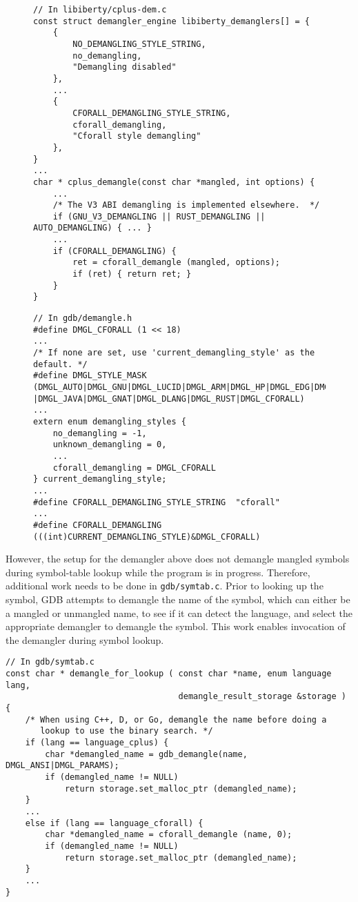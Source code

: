 \begin{figure}
\begin{lstlisting}[style=C++, caption={libiberty setup for the \CFAS demangler},
label={cfa-demangler}, basicstyle=\small]
// In libiberty/cplus-dem.c
const struct demangler_engine libiberty_demanglers[] = {
    {
        NO_DEMANGLING_STYLE_STRING,
        no_demangling,
        "Demangling disabled"
    },
    ...
    {
        CFORALL_DEMANGLING_STYLE_STRING,
        cforall_demangling,
        "Cforall style demangling"
    },
}
...
char * cplus_demangle(const char *mangled, int options) {
    ...
    /* The V3 ABI demangling is implemented elsewhere.  */
    if (GNU_V3_DEMANGLING || RUST_DEMANGLING || AUTO_DEMANGLING) { ... }
    ...
    if (CFORALL_DEMANGLING) {
        ret = cforall_demangle (mangled, options);
        if (ret) { return ret; }
    }
}
\end{lstlisting}

\begin{lstlisting}[style=C++, caption={Setup \CFAS demangler style},
label={cfa-demangler-style}, basicstyle=\small]
// In gdb/demangle.h
#define DMGL_CFORALL (1 << 18)
...
/* If none are set, use 'current_demangling_style' as the default. */
#define DMGL_STYLE_MASK
(DMGL_AUTO|DMGL_GNU|DMGL_LUCID|DMGL_ARM|DMGL_HP|DMGL_EDG|DMGL_GNU_V3
|DMGL_JAVA|DMGL_GNAT|DMGL_DLANG|DMGL_RUST|DMGL_CFORALL)
...
extern enum demangling_styles {
    no_demangling = -1,
    unknown_demangling = 0,
    ...
    cforall_demangling = DMGL_CFORALL
} current_demangling_style;
...
#define CFORALL_DEMANGLING_STYLE_STRING  "cforall"
...
#define CFORALL_DEMANGLING (((int)CURRENT_DEMANGLING_STYLE)&DMGL_CFORALL)
\end{lstlisting}
\end{figure}

However, the setup for the \CFAS demangler above does not demangle mangled
symbols during symbol-table lookup while the program is in progress. Therefore,
additional work needs to be done in \verb|gdb/symtab.c|. Prior to looking up
the symbol, GDB attempts to demangle the name of the symbol, which can either
be a mangled or unmangled name, to see if it can detect the language, and select
the appropriate demangler to demangle the symbol. This work enables invocation
of the \CFAS demangler during symbol lookup.
\begin{lstlisting}[style=C++, caption={\CFAS demangler setup for symbol lookup},
label={cfa-symstab-setup}, basicstyle=\small]
// In gdb/symtab.c
const char * demangle_for_lookup ( const char *name, enum language lang,
                                   demangle_result_storage &storage ) {
    /* When using C++, D, or Go, demangle the name before doing a
       lookup to use the binary search. */
    if (lang == language_cplus) {
        char *demangled_name = gdb_demangle(name, DMGL_ANSI|DMGL_PARAMS);
        if (demangled_name != NULL)
            return storage.set_malloc_ptr (demangled_name);
    }
    ...
    else if (lang == language_cforall) {
        char *demangled_name = cforall_demangle (name, 0);
        if (demangled_name != NULL)
            return storage.set_malloc_ptr (demangled_name);
    }
    ...
}
\end{lstlisting}

